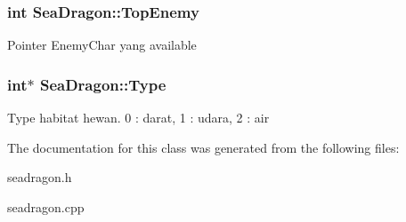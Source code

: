 \subsubsection[{\texorpdfstring{Top\+Enemy}{TopEnemy}}]{\setlength{\rightskip}{0pt plus 5cm}int Sea\+Dragon\+::\+Top\+Enemy\hspace{0.3cm}{\ttfamily [protected]}}\hypertarget{class_sea_dragon_a0848b59807364d124c40d0d4b344d22e}{}\label{class_sea_dragon_a0848b59807364d124c40d0d4b344d22e}
Pointer Enemy\+Char yang available 
\subsubsection[{\texorpdfstring{Type}{Type}}]{\setlength{\rightskip}{0pt plus 5cm}int$\ast$ Sea\+Dragon\+::\+Type\hspace{0.3cm}{\ttfamily [protected]}}\hypertarget{class_sea_dragon_a637d2f83f9e3ac2a24c981dd7fc6313b}{}\label{class_sea_dragon_a637d2f83f9e3ac2a24c981dd7fc6313b}
Type habitat hewan. 0 \+: darat, 1 \+: udara, 2 \+: air 

The documentation for this class was generated from the following files\+:\begin{DoxyCompactItemize}
\item 
seadragon.\+h\item 
seadragon.\+cpp\end{DoxyCompactItemize}
